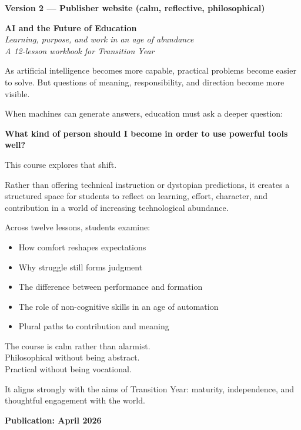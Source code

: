 \documentclass[11pt,a4paper]{article}
\begin{document}
\textbf{Version 2 --- Publisher website (calm, reflective, philosophical)}

\begin{tcolorbox}[
  colback=white,
  colframe=teal!60!black,
  opacityframe=0.5,
  fonttitle=\bfseries\color{white},
  title={AI landing page copy --- Version 2},
  drop shadow
]
\textbf{AI and the Future of Education}\\
\textit{Learning, purpose, and work in an age of abundance}\\
\textit{A 12-lesson workbook for Transition Year}

\medskip

As artificial intelligence becomes more capable, practical problems become easier to solve. But questions of meaning, responsibility, and direction become more visible.

\medskip

When machines can generate answers, education must ask a deeper question:

\medskip

\textbf{What kind of person should I become in order to use powerful tools well?}

\medskip

This course explores that shift.

Rather than offering technical instruction or dystopian predictions, it creates a structured space for students to reflect on learning, effort, character, and contribution in a world of increasing technological abundance.

Across twelve lessons, students examine:
\begin{itemize}
  \item How comfort reshapes expectations
  \item Why struggle still forms judgment
  \item The difference between performance and formation
  \item The role of non-cognitive skills in an age of automation
  \item Plural paths to contribution and meaning
\end{itemize}

The course is calm rather than alarmist.\\
Philosophical without being abstract.\\
Practical without being vocational.

It aligns strongly with the aims of Transition Year: maturity, independence, and thoughtful engagement with the world.

\medskip

\textbf{Publication: April 2026}
\end{tcolorbox}
\end{document}
